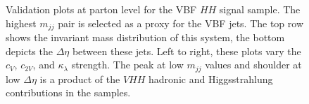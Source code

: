 \begin{figure}[htbp]
    \caption{Validation plots at parton level for the VBF $HH$ signal sample. The highest $m_{jj}$ pair is selected as a proxy for the VBF jets. The top row shows the invariant mass distribution of this system, the bottom depicts the $\Delta \eta$ between these jets. Left to right, these plots vary the $c_V$, $c_{2V}$, and $\kappa_\lambda$ strength. The peak at low $m_{jj}$ values and shoulder at low $\Delta \eta$ is a product of the $VHH$ hadronic and Higgsstrahlung contributions in the samples.}
    \label{fig:vbf-mc-validation}
\end{figure}